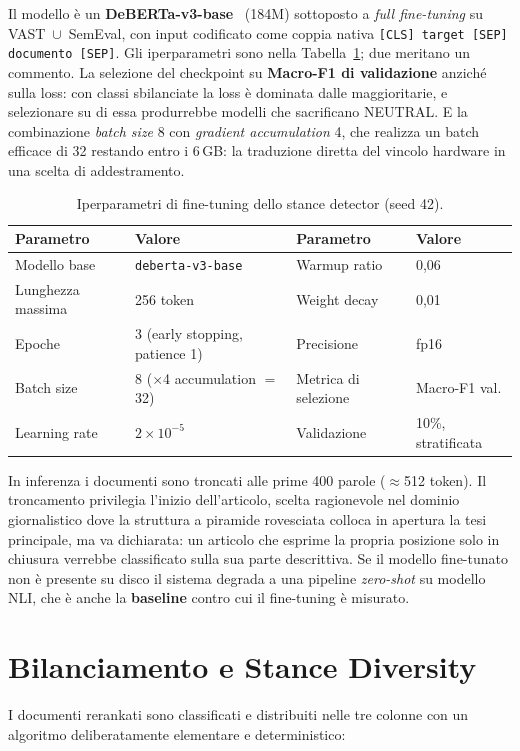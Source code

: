 \documentclass[11pt,a4paper]{report}
\begin{document}
Il modello è un \textbf{DeBERTa-v3-base}~\cite{deberta} (184M) sottoposto a \emph{full
fine-tuning} su VAST~$\cup$~SemEval, con input codificato come coppia nativa
\texttt{[CLS] target [SEP] documento [SEP]}. Gli iperparametri sono nella
Tabella~\ref{tab:iperparam-training}; due meritano un commento. La selezione del checkpoint su
\textbf{Macro-F1 di validazione} anziché sulla loss: con classi sbilanciate la loss è dominata
dalle maggioritarie, e selezionare su di essa produrrebbe modelli che sacrificano NEUTRAL. E la
combinazione \emph{batch size} 8 con \emph{gradient accumulation} 4, che realizza un batch
efficace di 32 restando entro i 6\,GB: la traduzione diretta del vincolo hardware in una scelta
di addestramento.

\begin{table}[t]
\centering
\small
\begin{tabular}{ll@{\qquad}ll}
\toprule
\textbf{Parametro} & \textbf{Valore} & \textbf{Parametro} & \textbf{Valore} \\
\midrule
Modello base & \texttt{deberta-v3-base} & Warmup ratio & 0,06 \\
Lunghezza massima & 256 token & Weight decay & 0,01 \\
Epoche & 3 (early stopping, patience 1) & Precisione & fp16 \\
Batch size & 8 ($\times$4 accumulation $=$ 32) & Metrica di selezione & Macro-F1 val. \\
Learning rate & $2 \times 10^{-5}$ & Validazione & 10\%, stratificata \\
\bottomrule
\end{tabular}
\caption{Iperparametri di fine-tuning dello stance detector (seed 42).}
\label{tab:iperparam-training}
\end{table}

In inferenza i documenti sono troncati alle prime 400 parole ($\approx$512 token). Il troncamento
privilegia l'inizio dell'articolo, scelta ragionevole nel dominio giornalistico dove la struttura
a piramide rovesciata colloca in apertura la tesi principale, ma va dichiarata: un articolo che
esprime la propria posizione solo in chiusura verrebbe classificato sulla sua parte descrittiva.
Se il modello fine-tunato non è presente su disco il sistema degrada a una pipeline
\emph{zero-shot} su modello NLI, che è anche la \textbf{baseline} contro cui il fine-tuning è
misurato.

\section{Bilanciamento e Stance Diversity}\label{sec:metodo-diversity}
I documenti rerankati sono classificati e distribuiti nelle tre colonne con un algoritmo
deliberatamente elementare e deterministico:
\end{document}

